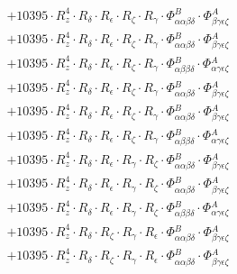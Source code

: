 \documentclass{article}
\begin{document}
\begin{subequations}
\begin{gather}
\begin{array}{c}
 \\[0.2em] 		 + 10395 \cdot R_{z}^{4} \cdot R_{\delta{}} \cdot R_{\epsilon{}} \cdot R_{\zeta{}} \cdot R_{\gamma{}} \cdot \Phi{}^{B}_{\alpha{}\alpha{}\beta{}\delta{}} \cdot \Phi{}^{A}_{\beta{}\gamma{}\epsilon{}\zeta{}} 
 \\[0.2em] 		 + 10395 \cdot R_{z}^{4} \cdot R_{\delta{}} \cdot R_{\epsilon{}} \cdot R_{\zeta{}} \cdot R_{\gamma{}} \cdot \Phi{}^{B}_{\alpha{}\alpha{}\beta{}\delta{}} \cdot \Phi{}^{A}_{\beta{}\gamma{}\epsilon{}\zeta{}} 
 \\[0.2em] 		 + 10395 \cdot R_{z}^{4} \cdot R_{\delta{}} \cdot R_{\epsilon{}} \cdot R_{\zeta{}} \cdot R_{\gamma{}} \cdot \Phi{}^{B}_{\alpha{}\beta{}\beta{}\delta{}} \cdot \Phi{}^{A}_{\alpha{}\gamma{}\epsilon{}\zeta{}} 
 \\[0.2em] 		 + 10395 \cdot R_{z}^{4} \cdot R_{\delta{}} \cdot R_{\epsilon{}} \cdot R_{\zeta{}} \cdot R_{\gamma{}} \cdot \Phi{}^{B}_{\alpha{}\alpha{}\beta{}\delta{}} \cdot \Phi{}^{A}_{\beta{}\gamma{}\epsilon{}\zeta{}} 
 \\[0.2em] 		 + 10395 \cdot R_{z}^{4} \cdot R_{\delta{}} \cdot R_{\epsilon{}} \cdot R_{\zeta{}} \cdot R_{\gamma{}} \cdot \Phi{}^{B}_{\alpha{}\alpha{}\beta{}\delta{}} \cdot \Phi{}^{A}_{\beta{}\gamma{}\epsilon{}\zeta{}} 
 \\[0.2em] 		 + 10395 \cdot R_{z}^{4} \cdot R_{\delta{}} \cdot R_{\epsilon{}} \cdot R_{\zeta{}} \cdot R_{\gamma{}} \cdot \Phi{}^{B}_{\alpha{}\beta{}\beta{}\delta{}} \cdot \Phi{}^{A}_{\alpha{}\gamma{}\epsilon{}\zeta{}} 
 \\[0.2em] 		 + 10395 \cdot R_{z}^{4} \cdot R_{\delta{}} \cdot R_{\epsilon{}} \cdot R_{\gamma{}} \cdot R_{\zeta{}} \cdot \Phi{}^{B}_{\alpha{}\alpha{}\beta{}\delta{}} \cdot \Phi{}^{A}_{\beta{}\gamma{}\epsilon{}\zeta{}} 
 \\[0.2em] 		 + 10395 \cdot R_{z}^{4} \cdot R_{\delta{}} \cdot R_{\epsilon{}} \cdot R_{\gamma{}} \cdot R_{\zeta{}} \cdot \Phi{}^{B}_{\alpha{}\alpha{}\beta{}\delta{}} \cdot \Phi{}^{A}_{\beta{}\gamma{}\epsilon{}\zeta{}} 
 \\[0.2em] 		 + 10395 \cdot R_{z}^{4} \cdot R_{\delta{}} \cdot R_{\epsilon{}} \cdot R_{\gamma{}} \cdot R_{\zeta{}} \cdot \Phi{}^{B}_{\alpha{}\beta{}\beta{}\delta{}} \cdot \Phi{}^{A}_{\alpha{}\gamma{}\epsilon{}\zeta{}} 
 \\[0.2em] 		 + 10395 \cdot R_{z}^{4} \cdot R_{\delta{}} \cdot R_{\zeta{}} \cdot R_{\gamma{}} \cdot R_{\epsilon{}} \cdot \Phi{}^{B}_{\alpha{}\alpha{}\beta{}\delta{}} \cdot \Phi{}^{A}_{\beta{}\gamma{}\epsilon{}\zeta{}} 
 \\[0.2em] 		 + 10395 \cdot R_{z}^{4} \cdot R_{\delta{}} \cdot R_{\zeta{}} \cdot R_{\gamma{}} \cdot R_{\epsilon{}} \cdot \Phi{}^{B}_{\alpha{}\alpha{}\beta{}\delta{}} \cdot \Phi{}^{A}_{\beta{}\gamma{}\epsilon{}\zeta{}} 

\end{array}
\end{gather}
\end{subequations}
\end{document}
